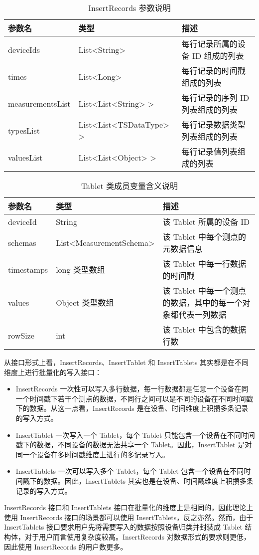 \begin{table}
  \centering
  \caption{InsertRecords 参数说明}
  \begin{tabular}{lll}
    \toprule
    参数名 &  类型 & 描述 \\
    \midrule
    deviceIds & List<String> & 每行记录所属的设备 ID 组成的列表 \\
     times & List<Long> & 每行记录的时间戳组成的列表 \\
    measurementsList & List<List<String> > & 每行记录的序列 ID 列表组成的列表 \\
    typesList & List<List<TSDataType> > & 每行记录数据类型列表组成的列表 \\
    valuesList & List<List<Object> > & 每行记录值列表组成的列表 \\
    \bottomrule
  \end{tabular}
  \label{tabular:insert-records-params}
\end{table}

\begin{table}
  \centering
  \caption{Tablet 类成员变量含义说明}
  \begin{tabular}{llp{6cm}}
    \toprule
    参数名 &  类型 & 描述 \\
    \midrule
    deviceId & String & 该 Tablet 所属的设备 ID \\
    schemas & List<MeasurementSchema> & 该 Tablet 中每个测点的元数据信息 \\
    timestamps & long 类型数组 & 该 Tablet 中每一行数据的时间戳 \\
    values & Object 类型数组 & 该 Tablet 中每一个测点的数据，其中的每一个对象都代表一列数据 \\
    rowSize & int & 该 Tablet 中包含的数据行数\\
    \bottomrule
  \end{tabular}
  \label{tabular:class-tablet-param}
\end{table}

从接口形式上看，InsertRecords、InsertTablet 和 InsertTablets 其实都是在不同维度上进行批量化的写入接口：
\begin{itemize}
  \item InsertRecords 一次性可以写入多行数据，每一行数据都是任意一个设备在同一个时间戳下若干个测点的数据，不同行之间可以是不同的设备在不同时间戳下的数据。从这一点看，InsertRecords 是在设备、时间维度上积攒多条记录的写入方式。
  \item InsertTablet 一次写入一个 Tablet，每个 Tablet 只能包含一个设备在不同时间戳下的数据，不同设备的数据无法共享一个 Tablet。因此，InsertTablet 是对同一个设备在多时间戳维度上进行的多记录写入。
  \item InsertTablets 一次可以写入多个 Tablet，每个 Tablet 包含一个设备在不同时间戳下的数据。因此，InsertTablets 其实也是在设备、时间戳维度上积攒多条记录的写入方式。
\end{itemize}
InsertRecords 接口和 InsertTablets 接口在批量化的维度上是相同的，因此理论上使用 InsertRecords 接口的场景都可以使用 InsertTablets，反之亦然。然而，由于 InsertTablets 接口要求用户先将需要写入的数据按照设备归类并封装成 Tablet 结构体，对于用户而言使用复杂度较高。InsertRecords 对数据形式的要求则更低，因此使用 InsertRecords 的用户数更多。
